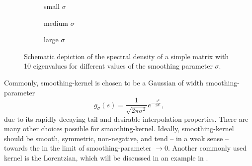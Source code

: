 \begin{figure}[ht]
    \begin{subfigure}[b]{0.32\columnwidth}
        
        \caption{small $\sigma$}
        \label{fig:1-introduction-spectral-density-example-0.01}
    \end{subfigure}
    \begin{subfigure}[b]{0.32\columnwidth}
        
        \caption{medium $\sigma$}
        \label{fig:1-introduction-spectral-density-example-0.02}
    \end{subfigure}
    \begin{subfigure}[b]{0.32\columnwidth}
        
        \caption{large $\sigma$}
        \label{fig:1-introduction-spectral-density-example-0.05}
    \end{subfigure}
    \caption{Schematic depiction of the spectral density of a simple matrix with
    10 eigenvalues for different values of the smoothing parameter $\sigma$.}
    \label{fig:1-introduction-smoothened-spectral-density}
\end{figure}

Commonly, \gls{smoothing-kernel} is chosen to be a Gaussian of width \gls{smoothing-parameter}
\begin{equation}
    g_{\sigma}(s) = \frac{1}{\sqrt{2 \pi \sigma^2}} e^{-\frac{s^2}{2\sigma^2}},
    \label{equ:1-introduction-def-gaussian-kernel}
\end{equation}
due to its rapidly decaying tail and desirable interpolation properties.
There are many other choices possible for \gls{smoothing-kernel}. Ideally,
\gls{smoothing-kernel} should be smooth, symmetric, non-negative, and tend -- in a weak sense --
towards the  in the limit of \gls{smoothing-parameter} $\to 0$. Another
commonly used kernel is the Lorentzian, which will be discussed in an example
in .\\

